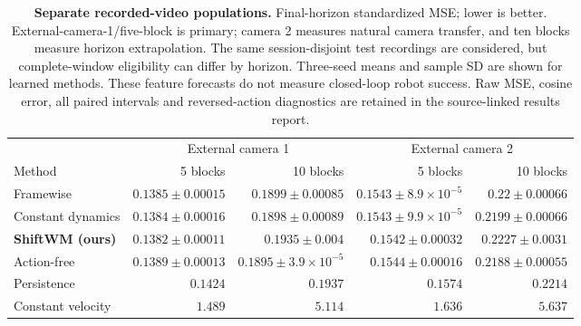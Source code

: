 \begin{table}[t]\centering\footnotesize
\setlength{\tabcolsep}{4pt}\renewcommand{\arraystretch}{1.12}
\begin{tabular}{lrrrr}\toprule
& \multicolumn{2}{c}{External camera 1} & \multicolumn{2}{c}{External camera 2}\\
\cmidrule(lr){2-3}\cmidrule(l){4-5}
Method & 5 blocks & 10 blocks & 5 blocks & 10 blocks\\\midrule
Framewise & $0.1385\pm0.00015$ & $0.1899\pm0.00085$ & $0.1543\pm8.9\!\times\!10^{-5}$ & $0.22\pm0.00066$\\
Constant dynamics & $0.1384\pm0.00016$ & $0.1898\pm0.00089$ & $0.1543\pm9.9\!\times\!10^{-5}$ & $0.2199\pm0.00066$\\
\rowcolor{orange!9}
\textbf{ShiftWM (ours)} & $0.1382\pm0.00011$ & $0.1935\pm0.004$ & $0.1542\pm0.00032$ & $0.2227\pm0.0031$\\
Action-free & $0.1389\pm0.00013$ & $0.1895\pm3.9\!\times\!10^{-5}$ & $0.1544\pm0.00016$ & $0.2188\pm0.00055$\\
\midrule
Persistence & $0.1424$ & $0.1937$ & $0.1574$ & $0.2214$\\
Constant velocity & $1.489$ & $5.114$ & $1.636$ & $5.637$\\
\bottomrule\end{tabular}
\caption{\textbf{Separate recorded-video populations.} Final-horizon standardized MSE; lower is better. External-camera-1/five-block is primary; camera 2 measures natural camera transfer, and ten blocks measure horizon extrapolation. The same session-disjoint test recordings are considered, but complete-window eligibility can differ by horizon. Three-seed means and sample SD are shown for learned methods. These feature forecasts do not measure closed-loop robot success. Raw MSE, cosine error, all paired intervals and reversed-action diagnostics are retained in the source-linked results report.}
\label{tab:real-video-transfer}\end{table}
